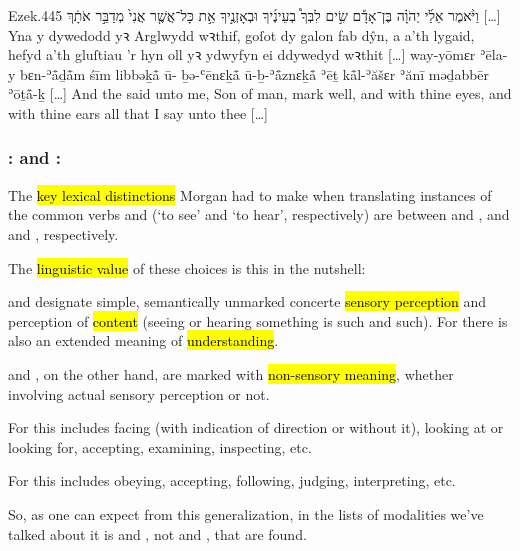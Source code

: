 \begin{example}{Ezek.}{44}{5}{}{}
	\quoling
	{וַיֹּ֨אמֶר אֵלַ֜י יְהֹוָ֗ה בֶּן־אָדָ֡ם שִׂ֣ים לִבְּךָ֩  בְעֵינֶ֜יךָ וּבְאָזְנֶ֣יךָ  אֵ֣ת כָּל־אֲשֶׁ֤ר אֲנִי֙ מְדַבֵּ֣ר אֹתָ֔ךְ […]}
	{Yna y dywedodd yꝛ Arglwydd wꝛthif, goſot dy galon fab dŷn, a  a’th lygaid,  hefyd a’th gluſtiau ’r hyn oll yꝛ ydwyfyn ei ddywedyd wꝛthit […]}
	{way-yōmɛr ʾēla-y {\YHWH} bɛn-ʾå̄ḏå̄m śīm libbəḵå̄ ū- ḇə-ʿēnɛḵå̄ ū-ḇ-ʾå̄znɛḵå̄  ʾēṯ kå̄l-ʾăšɛr ʾănī məḏabbēr ʾōṯå̄-ḵ […]}
	{And the {\LORD} said unto me, Son of man, mark well, and  with thine eyes, and  with thine ears all that I say unto thee […]}
\end{example}



\subsubsection{: and :}

\begin{paper}
	{\click} The \hl{key lexical distinctions} Morgan had to make when translating instances of the common verbs  and  (‘to see’ and ‘to hear’, respectively) are between  and , and  and , respectively.

	{\click} The \hl{linguistic value} of these choices is this in the nutshell:
	\begin{compactitem}
		\item {} and  designate simple, semantically unmarked concerte \hl{sensory perception} and perception of \hl{content} (seeing or hearing something is such and such). For  there is also an extended meaning of \hl{understanding}.
		\item {} and , on the other hand, are marked with \hl{non-sensory meaning}, whether involving actual sensory perception or not.
			\begin{compactitem}
				\item For  this includes facing (with indication of direction or without it), looking at or looking for, accepting, examining, inspecting, etc.
				\item For  this includes obeying, accepting, following, judging, interpreting, etc.
			\end{compactitem}
	\end{compactitem}

	So, as one can expect from this generalization, in the lists of modalities we’ve talked about it is  and , not  and , that are found.
\end{paper}

